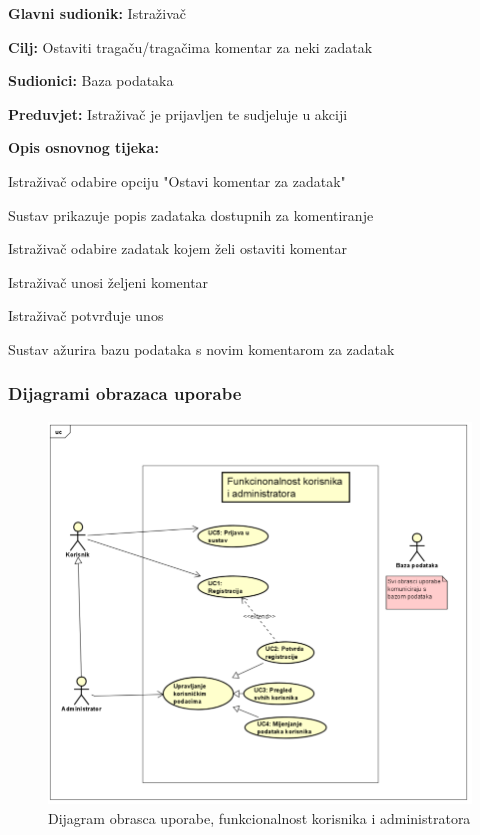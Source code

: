 					\noindent {}
					\begin{packed_item}
						
						\item \textbf{Glavni sudionik: }Istraživač
						\item  \textbf{Cilj:} Ostaviti tragaču/tragačima komentar za neki zadatak 
						\item  \textbf{Sudionici:} Baza podataka
						\item  \textbf{Preduvjet:} Istraživač je prijavljen te sudjeluje u akciji 
						\item  \textbf{Opis osnovnog tijeka:}
						
						\item[] \begin{packed_enum}
							
							\item Istraživač odabire opciju "Ostavi komentar za zadatak" 
							\item Sustav prikazuje popis zadataka dostupnih za komentiranje 
							\item Istraživač odabire zadatak kojem želi ostaviti komentar 
							\item Istraživač unosi željeni komentar 
							\item Istraživač potvrđuje unos 
							\item Sustav ažurira bazu podataka s novim komentarom za zadatak 
						\end{packed_enum}
					\end{packed_item}
					
				\subsubsection{Dijagrami obrazaca uporabe}
					\begin{figure}[H]
						\includegraphics[scale=0.8]{dijagrami/Korisnik-admin-dijagram.PNG} 
						\centering
						\caption{Dijagram obrasca uporabe, funkcionalnost korisnika i administratora}
						\label{fig:promjene}
					\end{figure}	
					
